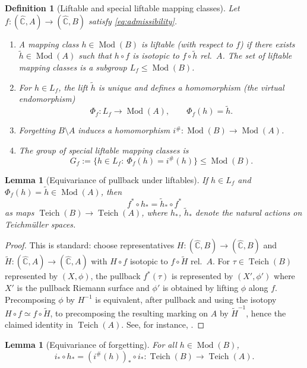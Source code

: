 \documentclass[11pt]{article}
\newtheorem{lemma}[theorem]{Lemma}
\newtheorem{definition}[theorem]{Definition}
\DeclareMathOperator{\Teich}{Teich}
\DeclareMathOperator{\Mod}{Mod}
\begin{document}
\begin{definition}[Liftable and special liftable mapping classes]
Let $f:(\widehat{\mathbb C},A)\to (\widehat{\mathbb C},B)$ satisfy \eqref{eq:admissibility}.
\begin{enumerate}
\item A mapping class $h\in \Mod(B)$ is \emph{liftable} (with respect to $f$) if there exists $\widetilde h\in \Mod(A)$ such that $h\circ f$ is isotopic to $f\circ \widetilde h$ rel.\ $A$. The set of liftable mapping classes is a subgroup $L_f\le \Mod(B)$.
\item For $h\in L_f$, the lift $\widetilde h$ is unique and defines a homomorphism (the \emph{virtual endomorphism})
\[
\Phi_f:L_f\to \Mod(A),\qquad \Phi_f(h)=\widetilde h.
\]
\item Forgetting $B\setminus A$ induces a homomorphism $i^\#: \Mod(B)\to \Mod(A)$.
\item The group of \emph{special liftable} mapping classes is
\[
G_f:=\{h\in L_f:\ \Phi_f(h)=i^\#(h)\}\le \Mod(B).
\]
\end{enumerate}
\end{definition}

\begin{lemma}[Equivariance of pullback under liftables]\label{lem:equivariance}
If $h\in L_f$ and $\Phi_f(h)=\widetilde h\in \Mod(A)$, then
\[
f^*\circ h_* = \widetilde h_* \circ f^*
\]
as maps $\Teich(B)\to \Teich(A)$, where $h_*$, $\widetilde h_*$ denote the natural actions on Teichm\"uller spaces.
\end{lemma}

\begin{proof}
This is standard: choose representatives $H:(\widehat{\mathbb C},B)\to(\widehat{\mathbb C},B)$ and $\widetilde H:(\widehat{\mathbb C},A)\to(\widehat{\mathbb C},A)$ with $H\circ f$ isotopic to $f\circ \widetilde H$ rel.\ $A$. For $\tau\in \Teich(B)$ represented by $(X,\phi)$, the pullback $f^*(\tau)$ is represented by $(X',\phi')$ where $X'$ is the pullback Riemann surface and $\phi'$ is obtained by lifting $\phi$ along $f$. Precomposing $\phi$ by $H^{-1}$ is equivalent, after pullback and using the isotopy $H\circ f\simeq f\circ \widetilde H$, to precomposing the resulting marking on $A$ by $\widetilde H^{-1}$, hence the claimed identity in $\Teich(A)$. See, for instance, \cite[Prop.\ 3.2]{Koch10}.
\end{proof}

\begin{lemma}[Equivariance of forgetting]\label{lem:forget-equivariance}
For all $h\in \Mod(B)$,
\[
i_*\circ h_* = (i^\#(h))_* \circ i_*:\Teich(B)\to \Teich(A).
\]
\end{lemma}
\end{document}
